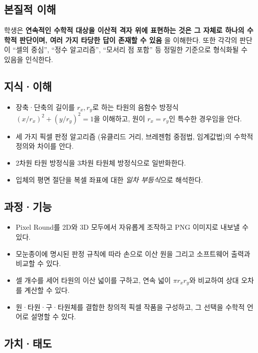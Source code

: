 \documentclass[12pt,a4paper]{scrartcl}
\newcommand{\acc}[1]{\textcolor{accent}{\textbf{#1}}}
\begin{document}
\subsection{본질적 이해}

학생은 \acc{연속적인 수학적 대상을 이산적 격자 위에 표현하는 것은 그 자체로 하나의 수학적 판단이며, 여러 가지 타당한 답이 존재할 수 있음} 을 이해한다. 또한 각각의 판단이 ``셀의 중심'', ``정수 알고리즘'', ``모서리 점 포함'' 등 정밀한 기준으로 형식화될 수 있음을 인식한다.

\subsection{지식·이해}

\begin{itemize}[leftmargin=1.3em,itemsep=0.15em,topsep=0.3em]
  \item 장축·단축의 길이를 $r_x, r_y$로 하는 타원의 음함수 방정식 $(x/r_x)^2 + (y/r_y)^2 = 1$을 이해하고, 원이 $r_x = r_y$인 특수한 경우임을 안다.
  \item 세 가지 픽셀 판정 알고리즘 (유클리드 거리, 브레젠험 중점법, 임계값법)의 수학적 정의와 차이를 안다.
  \item 2차원 타원 방정식을 3차원 타원체 방정식으로 일반화한다.
  \item 입체의 평면 절단을 복셀 좌표에 대한 \emph{일차 부등식}으로 해석한다.
\end{itemize}

\subsection{과정·기능}

\begin{itemize}[leftmargin=1.3em,itemsep=0.15em,topsep=0.3em]
  \item Pixel Round를 2D와 3D 모두에서 자유롭게 조작하고 PNG 이미지로 내보낼 수 있다.
  \item 모눈종이에 명시된 판정 규칙에 따라 손으로 이산 원을 그리고 소프트웨어 출력과 비교할 수 있다.
  \item 셀 개수를 세어 타원의 이산 넓이를 구하고, 연속 넓이 $\pi r_x r_y$와 비교하여 상대 오차를 계산할 수 있다.
  \item 원·타원·구·타원체를 결합한 창의적 픽셀 작품을 구성하고, 그 선택을 수학적 언어로 설명할 수 있다.
\end{itemize}

\subsection{가치·태도}
\end{document}
